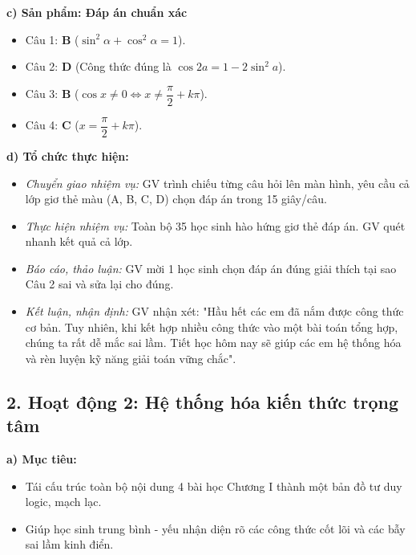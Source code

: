 \documentclass[12pt, a4paper]{article}
\begin{document}
\noindent \textbf{c) Sản phẩm: Đáp án chuẩn xác}  
\begin{itemize}[leftmargin=0.8cm]  
    \item Câu 1: \textbf{B} ($\sin^2\alpha + \cos^2\alpha = 1$).  
    \item Câu 2: \textbf{D} (Công thức đúng là $\cos 2a = 1 - 2\sin^2 a$).  
    \item Câu 3: \textbf{B} ($\cos x \neq 0 \iff x \neq \dfrac{\pi}{2} + k\pi$).  
    \item Câu 4: \textbf{C} ($x = \dfrac{\pi}{2} + k\pi$).  
\end{itemize}  
  
\noindent \textbf{d) Tổ chức thực hiện:}  
\begin{itemize}[leftmargin=0.8cm]  
    \item \textit{Chuyển giao nhiệm vụ:} GV trình chiếu từng câu hỏi lên màn hình, yêu cầu cả lớp giơ thẻ màu (A, B, C, D) chọn đáp án trong 15 giây/câu.  
    \item \textit{Thực hiện nhiệm vụ:} Toàn bộ 35 học sinh hào hứng giơ thẻ đáp án. GV quét nhanh kết quả cả lớp.  
    \item \textit{Báo cáo, thảo luận:} GV mời 1 học sinh chọn đáp án đúng giải thích tại sao Câu 2 sai và sửa lại cho đúng.  
    \item \textit{Kết luận, nhận định:} GV nhận xét: "Hầu hết các em đã nắm được công thức cơ bản. Tuy nhiên, khi kết hợp nhiều công thức vào một bài toán tổng hợp, chúng ta rất dễ mắc sai lầm. Tiết học hôm nay sẽ giúp các em hệ thống hóa và rèn luyện kỹ năng giải toán vững chắc".  
\end{itemize}  
  
\subsection*{2. Hoạt động 2: Hệ thống hóa kiến thức trọng tâm}  
  
\noindent \textbf{a) Mục tiêu:}  
\begin{itemize}[leftmargin=0.8cm]  
    \item Tái cấu trúc toàn bộ nội dung 4 bài học Chương I thành một bản đồ tư duy logic, mạch lạc.  
    \item Giúp học sinh trung bình - yếu nhận diện rõ các công thức cốt lõi và các bẫy sai lầm kinh điển.  
\end{itemize}  
  
\end{document}
